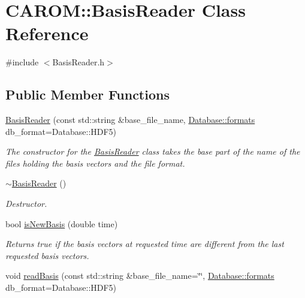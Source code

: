 \hypertarget{class_c_a_r_o_m_1_1_basis_reader}{\section{C\-A\-R\-O\-M\-:\-:Basis\-Reader Class Reference}
\label{class_c_a_r_o_m_1_1_basis_reader}
}


{\ttfamily \#include $<$Basis\-Reader.\-h$>$}

\subsection*{Public Member Functions}
\begin{DoxyCompactItemize}
\item 
\hyperlink{class_c_a_r_o_m_1_1_basis_reader_ab4d0ee6ca4a7071ab8c3fd61b58b9e97}{Basis\-Reader} (const std\-::string \&base\-\_\-file\-\_\-name, \hyperlink{class_c_a_r_o_m_1_1_database_a8ab29ee6466ef8415ee0ef93d94cc5f7}{Database\-::formats} db\-\_\-format=Database\-::\-H\-D\-F5)
\begin{DoxyCompactList}\small\item\em The constructor for the \hyperlink{class_c_a_r_o_m_1_1_basis_reader}{Basis\-Reader} class takes the base part of the name of the files holding the basis vectors and the file format. \end{DoxyCompactList}\item 
\hypertarget{class_c_a_r_o_m_1_1_basis_reader_ac4f468fdf09507336a62adadd9443a0f}{\hyperlink{class_c_a_r_o_m_1_1_basis_reader_ac4f468fdf09507336a62adadd9443a0f}{$\sim$\-Basis\-Reader} ()}\label{class_c_a_r_o_m_1_1_basis_reader_ac4f468fdf09507336a62adadd9443a0f}

\begin{DoxyCompactList}\small\item\em Destructor. \end{DoxyCompactList}\item 
bool \hyperlink{class_c_a_r_o_m_1_1_basis_reader_a1653f9dd5985a34ace9e4886d8668b0a}{is\-New\-Basis} (double time)
\begin{DoxyCompactList}\small\item\em Returns true if the basis vectors at requested time are different from the last requested basis vectors. \end{DoxyCompactList}\item 
\hypertarget{class_c_a_r_o_m_1_1_basis_reader_a24260370b460b0253d8efeb1cea81d4b}{void \hyperlink{class_c_a_r_o_m_1_1_basis_reader_a24260370b460b0253d8efeb1cea81d4b}{read\-Basis} (const std\-::string \&base\-\_\-file\-\_\-name=\char`\"{}\char`\"{}, \hyperlink{class_c_a_r_o_m_1_1_database_a8ab29ee6466ef8415ee0ef93d94cc5f7}{Database\-::formats} db\-\_\-format=Database\-::\-H\-D\-F5)}\label{class_c_a_r_o_m_1_1_basis_reader_a24260370b460b0253d8efeb1cea81d4b}


\end{DoxyCompactItemize}
